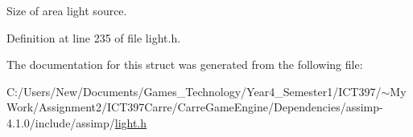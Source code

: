 Size of area light source. 

Definition at line 235 of file light.h.

The documentation for this struct was generated from the following file:\begin{CompactItemize}
\item 
C:/Users/New/Documents/Games\_\-Technology/Year4\_\-Semester1/ICT397/$\sim$My Work/Assignment2/ICT397Carre/CarreGameEngine/Dependencies/assimp-4.1.0/include/assimp/\hyperlink{light_8h}{light.h}\end{CompactItemize}
